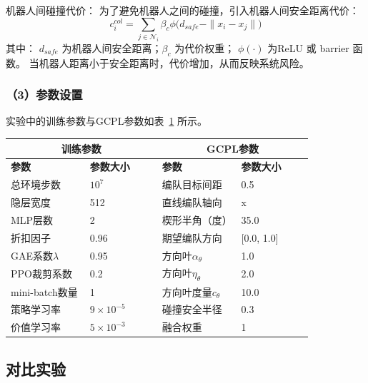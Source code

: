 机器人间碰撞代价：
为了避免机器人之间的碰撞，引入机器人间安全距离代价：
\begin{equation}
    c_i^{col} = \sum_{j\in\mathcal N_i} \beta_c \phi \big( d_{safe} - \|x_i - x_j\| \big)
\end{equation}
其中： $d_{safe}$ 为机器人间安全距离；$\beta_c$ 为代价权重； $\phi(\cdot)$ 为ReLU 或 barrier 函数。
当机器人距离小于安全距离时，代价增加，从而反映系统风险。

\subsubsection{（3）参数设置}
实验中的训练参数与GCPL参数如表~\ref{tab:GCPL_params} 所示。
\begin{table}[htbp]
\centering
{}
\label{tab:GCPL_params}
\small
\setlength{\tabcolsep}{5pt}
\renewcommand{\arraystretch}{0.95}
\begin{tabular}{p{0.22\linewidth} p{0.2\linewidth}|p{0.22\linewidth} p{0.2\linewidth}}
\hline
\multicolumn{2}{c|}{\textbf{训练参数}} & \multicolumn{2}{c}{\textbf{GCPL参数}} \\
\hline
\textbf{参数} & \textbf{参数大小} & \textbf{参数} & \textbf{参数大小} \\
\hline
总环境步数 & $10^7$ & 编队目标间距 & 0.5 \\
隐层宽度 & 512 &  直线编队轴向 & x \\
MLP层数 & 2 & 楔形半角（度） & 35.0 \\
折扣因子 & 0.96 & 期望编队方向 & [0.0, 1.0] \\
GAE系数$\lambda$ & 0.95 & 方向叶$\alpha_\theta$ & 1.0 \\
PPO裁剪系数 & 0.2 & 方向叶$\eta_\theta$ & 2.0 \\
mini-batch数量 & 1  & 方向叶度量$c_\theta$ & 10.0 \\
策略学习率 & $9\times10^{-5}$ & 碰撞安全半径 & 0.3 \\
价值学习率 & $5\times10^{-3}$ & 融合权重 & 1 \\

\hline
\end{tabular}
\end{table}

\subsection{对比实验}

